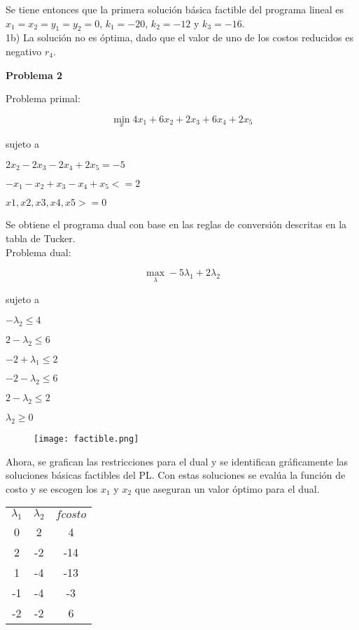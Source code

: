 \documentclass[10pt]{article}
\begin{document}
Se tiene entonces que la primera soluci\'on b\'asica factible del programa lineal es $x_1=x_2=y_1=y_2=0$, $k_1=-20$, $k_2=-12$ y $k_3=-16$. \\

1b) La soluci\'on no es \'optima, dado que el valor de uno de los costos reducidos es negativo $r_4$.

\bigskip
{\bf \Large{Problema 2}}
\medskip


Problema primal:

\begin{center}
\[\min_{x}  4x_1+6x_2+2x_3+6x_4+2x_5\] 

sujeto a

$2x_2-2x_3-2x_4+2x_5 = -5$

$-x_1-x_2+x_3-x_4+x_5 <= 2$

$x1, x2, x3, x4, x5 >= 0$

\end{center}

Se obtiene el programa dual con base en las reglas de conversión descritas en la tabla de Tucker. \\


Problema dual:
\begin{center}
\[\max_{\lambda} -5\lambda_1+2\lambda_2 \] 

sujeto a

$-\lambda_2 \leq 4$

$2-\lambda_2\leq6$

$-2+\lambda_1\leq2$

$-2-\lambda_2\leq6$

$2-\lambda_2\leq2$

$\lambda_2\geq0$

\end{center}

\begin{figure}[ht!]
\texttt{[image: factible.png]}
\end{figure}

Ahora, se grafican las restricciones para el dual y se identifican gr\'aficamente las soluciones básicas factibles del PL. Con estas soluciones se eval\'ua la funci\'on de costo y se escogen los $x_1$ y $x_2$ que aseguran un valor \'optimo para el dual.
\bigskip

\begin{center}
\begin{tabular}{c c c}
{\bf$\lambda_1$}	& {\bf$\lambda_2$} &{\bf$fcosto$} \\
0&	2&	4\\
2&	-2&	-14\\
1&	-4&	-13\\
-1&	-4&	-3\\
-2&	-2&	6\\
\end{tabular}
\end{center}
\end{document}
